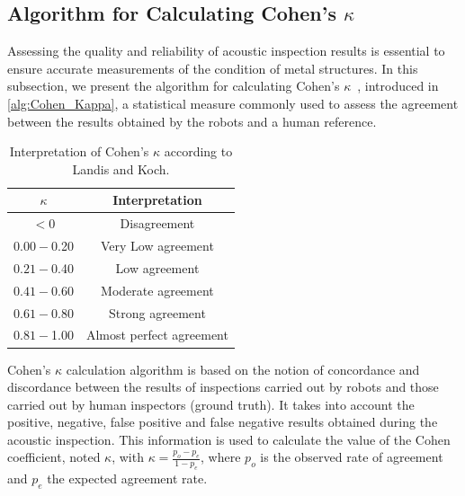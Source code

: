 \subsection*{Algorithm for Calculating Cohen's $\kappa$}

Assessing the quality and reliability of acoustic inspection results is essential to ensure accurate measurements of the condition of metal structures.
In this subsection, we present the algorithm for calculating Cohen's $\kappa$~\cite{enwiki:1130024730}, introduced in \ref{alg:Cohen_Kappa}, a statistical measure commonly used to assess the agreement between the results obtained by the robots and a human reference.

\begin{table}[h!]
	\centering
	\begin{tabular}{|c|c|}
		\hline
		$\kappa$ & Interpretation \\
		\hline
		$< 0$ & Disagreement \\
		\hline
		$0.00 - $0.20 & Very Low agreement \\
		\hline
		$0.21 - $0.40 & Low agreement \\
		\hline
		$0.41 - $0.60 & Moderate agreement \\
		\hline
		$0.61 - $0.80 & Strong agreement \\
		\hline
		$0.81 - $1.00 & Almost perfect agreement \\
		\hline
	\end{tabular}
	\caption{Interpretation of Cohen's $\kappa$ according to Landis and Koch.}
	\label{tab:Kappa_Cohen}
\end{table}

Cohen's $\kappa$ calculation algorithm is based on the notion of concordance and discordance between the results of inspections carried out by robots and those carried out by human inspectors (ground truth).
It takes into account the positive, negative, false positive and false negative results obtained during the acoustic inspection.
This information is used to calculate the value of the Cohen coefficient, noted $\kappa$, with $\kappa = \frac{p_o - p_e}{1 - p_e}$, where $p_o$ is the observed rate of agreement and $p_e$ the expected agreement rate.

